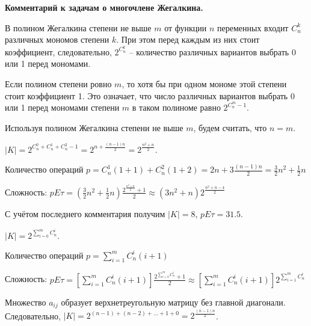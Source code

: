 \documentclass[letterpaper,11pt,openany]{book}
\begin{document}
\noindent \textbf{Комментарий к задачам о многочлене Жегалкина.}

В полином Жегалкина степени не выше $m$ от функции $n$ переменных входит $C_n ^ k$ различных мономов степени $k$. При этом перед каждым из них стоит коэффициент, следовательно, $2 ^ {C_n ^ k}$ -- количество различных вариантов выбрать 0 или 1 перед мономами.

Если полином степени ровно $m$, то хотя бы при одном мономе этой степени стоит коэффициент 1. Это означает, что число различных вариантов выбрать 0 или 1 перед мономами степени $m$ в таком полиноме равно $2 ^ {C_n ^ m - 1}$.

Используя полином Жегалкина степени не выше $m$, будем считать, что $n = m$.


\noindent $|K| = 2 ^ {C_n ^ 0 + C_n ^ 1 + C_n ^ 2 - 1} = 2 ^ {n + \frac{(n-1)n}{2}} = 2 ^ { \frac{n ^ 2 + n}{2} }.$

\noindent Количество операций $p = C_n ^ 1 (1 + 1) + C_n ^ 2 (1 + 2) = 2n + 3 \frac{(n-1)n}{2} = \frac{3}{2} n ^ 2 + \frac{1}{2} n$

\noindent Сложность: $pE\tau = (\frac{3}{2} n ^ 2 + \frac{1}{2} n) \frac{2 ^ { \frac{n ^ 2 + n}{2} } + 1}{2} \approx (3n ^ 2 + n) 2 ^ { \frac{n ^ 2 + n - 4}{2} }$

С учётом последнего комментария получим $|K| = 8$, $pE\tau = 31.5$.


\noindent $|K| = 2 ^ { \sum _{i = 0} ^ m C_n ^ i}.$

\noindent Количество операций $p = \sum _{i = 1} ^ m C_n ^ i (i + 1)$

\noindent Сложность: $pE\tau = [\sum _{i = 1} ^ m C_n ^ i (i + 1)] \frac{2 ^ { \sum _{i = 0} ^ m C_n ^ i} + 1}{2} \approx [\sum _{i = 1} ^ m C_n ^ i (i + 1)] 2 ^ { \sum _{i = 1} ^ m C_n ^ i}$


Множество $a_{ij}$ образует верхнетреугольную матрицу без главной диагонали. Следовательно, $|K| = 2 ^ {(n - 1) + (n - 2) + ... + 1 + 0} = 2 ^ { \frac{(n-1)n}{2} }$.
\end{document}

